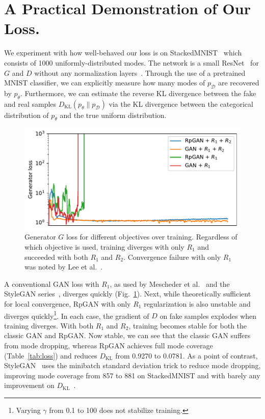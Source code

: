 \section{A Practical Demonstration of Our Loss.}

We experiment with how well-behaved our loss is on StackedMNIST~\cite{pacgan} which consists of 1000 uniformly-distributed modes. The network is a small ResNet~\cite{resnet2} for $G$ and $D$ without any normalization layers~\cite{bn,gn,ln,in}.
Through the use of a pretrained MNIST classifier, we can explicitly measure how many modes of $p_\mathcal{D}$ are recovered by $p_\theta$. Furthermore, we can estimate the reverse KL divergence between the fake and real samples $D_\text{KL}\left(p_\theta\parallel p_\mathcal{D} \right)$ via the KL divergence between the categorical distribution of $p_\theta$ and the true uniform distribution.
\begin{figure}[t]
\includegraphics[width=1\linewidth]{figures/MNIST_loss.pdf}
\caption{Generator $G$ loss for different objectives over training. Regardless of which objective is used, training diverges with only $R_1$ and succeeded with both $R_1$ and $R_2$. Convergence failure with only $R_1$ was noted by Lee et al.~\cite{vitgan}.}
\label{fig:mnist_loss_curve}
\end{figure}

A conventional GAN loss with $R_1$, as used by Mescheder et al.~\cite{r1} and the StyleGAN series~\cite{sg1, sg2, sg3}, diverges quickly (Fig.~\ref{fig:mnist_loss_curve}). Next, while theoretically sufficient for local convergence, RpGAN with only $R_1$ regularization is also unstable and diverges quickly\footnote{Varying $\gamma$ from 0.1 to 100 does not stabilize training.}. In each case, the gradient of $D$ on fake samples explodes when training diverges. With both $R_1$ and $R_2$, training becomes stable for both the classic GAN and RpGAN. Now stable, we can see that the classic GAN suffers from mode dropping, whereas RpGAN achieves full mode coverage (Table~\ref{tab:loss}) and reduces $D_\text{KL}$ from 0.9270 to 0.0781. As a point of contrast, StyleGAN~\cite{sg1,sg2,sg2ada,sg3} uses the minibatch standard deviation trick to reduce mode dropping, improving mode coverage from 857 to 881 on StackedMNIST and with barely any improvement on $D_\text{KL}$~\cite{pggan}.


